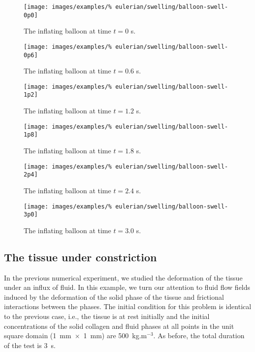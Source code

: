 \begin{figure}[!hptb]
\centering
\texttt{[image: images/examples/\%
eulerian/swelling/balloon-swell-0p0]}
\caption{The inflating balloon at time $t=0$ s.} 
\label{swelling-balloon-image-0p0}
\end{figure}

\begin{figure}[!hptb]
\centering
\texttt{[image: images/examples/\%
eulerian/swelling/balloon-swell-0p6]}
\caption{The inflating balloon at time $t=0.6$ s.} 
\label{swelling-balloon-image-0p6}
\end{figure}

\begin{figure}[!hptb]
\centering
\texttt{[image: images/examples/\%
eulerian/swelling/balloon-swell-1p2]}
\caption{The inflating balloon at time $t=1.2$ s.} 
\label{swelling-balloon-image-1p2}
\end{figure}

\begin{figure}[!hptb]
\centering
\texttt{[image: images/examples/\%
eulerian/swelling/balloon-swell-1p8]}
\caption{The inflating balloon at time $t=1.8$ s.} 
\label{swelling-balloon-image-1p8}
\end{figure}

\begin{figure}[!hptb]
\centering
\texttt{[image: images/examples/\%
eulerian/swelling/balloon-swell-2p4]}
\caption{The inflating balloon at time $t=2.4$ s.} 
\label{swelling-balloon-image-2p4}
\end{figure}

\begin{figure}[!hptb]
\centering
\texttt{[image: images/examples/\%
eulerian/swelling/balloon-swell-3p0]}
\caption{The inflating balloon at time $t=3.0$ s.} 
\label{swelling-balloon-image-3p0}
\end{figure}

\clearpage

\subsection{The tissue under constriction}
\label{constriction-2}

In the previous numerical experiment, we studied the deformation of
the tissue under an influx of fluid. In this example, we turn our
attention to fluid flow fields induced by the deformation of the solid
phase of the tissue and frictional interactions between the
phases. The initial condition for this problem is identical to the
previous case, i.e., the tissue is at rest initially and the initial
concentrations of the solid collagen and fluid phases at all points in
the unit square domain \mbox{(1~mm $\times$ 1~mm)} are
500~kg.m$^{-3}$. As before, the total duration of the test is 3~s.


